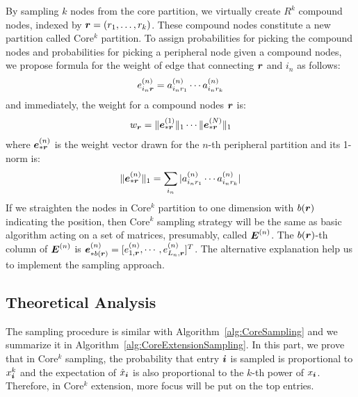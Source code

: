 \documentclass[10pt,journal,compsoc]{IEEEtran}
\newcommand{\Sca}[3]{{#1}^{(#2)}_{i_#2#3}}%
\newcommand{\anr}[2]{\Sca{a}{#1}{#2}}
\newcommand{\enr}[2]{\Sca{e}{#1}{\V{#2}}}
\newcommand{\V}[1]{{\boldsymbol{{\MakeLowercase{#1}}}}}
\newcommand{\ColVec}[3]{\V{#1}^{(#2)}_{#3}}
\newcommand{\NormColE}[2]{\norm{\ColVec{e}{#1}{*\V{#2}}}{1}}
\newcommand{\predx}{\hat{x}_{\V{i}}}
\newcommand{\M}[1]{{\boldsymbol{{\MakeUppercase{#1}}}}}
\newcommand{\FacMat}[2]{\M{#1}^{(#2)}}
\newcommand{\norm}[2]{\|#1\|_{#2}}
\newcommand{\Alg}[1]{Algorithm~\ref{alg:#1}}
\begin{document}
By sampling $k$ nodes from the core partition,
we virtually create $R^k$ compound nodes,
indexed by $\V{r}=(r_1,\ldots,r_k)$.
These compound nodes constitute a new partition called Core$^k$ partition.
To assign probabilities for picking the compound nodes and probabilities for picking a peripheral node given a compound nodes, we propose formula for the weight of edge that connecting $\V{r}$ and $i_n$ as follows:
\begin{align}
\enr{n}{r} = \anr{n}{r_1}\cdots\anr{n}{r_k}
\end{align}
and immediately, the weight for a compound nodes $\V{r}$ is:
\begin{align}
w_{\V{r}} = \NormColE{1}{r}\cdots\NormColE{N}{r}
\end{align}
where $\V{e}_{*\V{r}}^{(n)}$ is the weight vector drawn for the $n$-th peripheral partition and its  1-norm is:
\begin{align}
\NormColE{n}{r} = \sum_{i_n}|\anr{n}{r_1}\cdots\anr{n}{r_k}|
\end{align}
If we straighten the nodes in Core$^k$ partition to one dimension with $b(\V{r})$ indicating the position, then Core$^k$ sampling strategy will be the same as basic algorithm acting on a set of matrices, presumably, called $\M{E}^{(n)}$.
The $b(\V{r})$-th column of $\M{E}^{(n)}$ is $\V{e}_{*b(\V{r})}^{(n)} = [e_{1,\V{r}}^{(n)},\cdots,e_{L_n,\V{r}}^{(n)}]^T$.
The alternative explanation help us to implement the sampling approach.

\subsection{Theoretical Analysis}

The sampling procedure is similar with \Alg{CoreSampling}
and we summarize it in \Alg{CoreExtensionSampling}.
In this part, we prove that in Core$^k$ sampling,
the probability that entry $\V{i}$ is sampled is proportional to $x_{\V{i}}^k$
and the expectation of $\predx$ is also proportional to the $k$-th power of $x_{\V{i}}$.
Therefore, in Core$^k$ extension, more focus will be put on the top entries.
\end{document}
